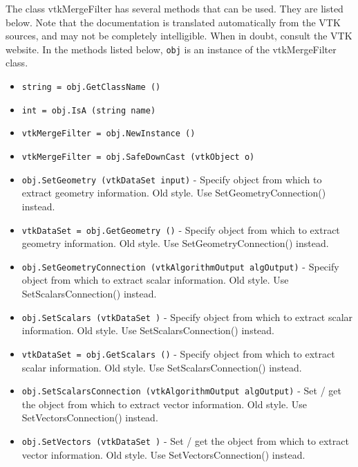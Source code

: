 The class vtkMergeFilter has several methods that can be used.
  They are listed below.
Note that the documentation is translated automatically from the VTK sources,
and may not be completely intelligible.  When in doubt, consult the VTK website.
In the methods listed below, \verb|obj| is an instance of the vtkMergeFilter class.
\begin{itemize}
\item  \verb|string = obj.GetClassName ()|

\item  \verb|int = obj.IsA (string name)|

\item  \verb|vtkMergeFilter = obj.NewInstance ()|

\item  \verb|vtkMergeFilter = obj.SafeDownCast (vtkObject o)|

\item  \verb|obj.SetGeometry (vtkDataSet input)| -  Specify object from which to extract geometry information.
 Old style. Use SetGeometryConnection() instead.

\item  \verb|vtkDataSet = obj.GetGeometry ()| -  Specify object from which to extract geometry information.
 Old style. Use SetGeometryConnection() instead.

\item  \verb|obj.SetGeometryConnection (vtkAlgorithmOutput algOutput)| -  Specify object from which to extract scalar information.
 Old style. Use SetScalarsConnection() instead.

\item  \verb|obj.SetScalars (vtkDataSet )| -  Specify object from which to extract scalar information.
 Old style. Use SetScalarsConnection() instead.

\item  \verb|vtkDataSet = obj.GetScalars ()| -  Specify object from which to extract scalar information.
 Old style. Use SetScalarsConnection() instead.

\item  \verb|obj.SetScalarsConnection (vtkAlgorithmOutput algOutput)| -  Set / get the object from which to extract vector information.
 Old style. Use SetVectorsConnection() instead.

\item  \verb|obj.SetVectors (vtkDataSet )| -  Set / get the object from which to extract vector information.
 Old style. Use SetVectorsConnection() instead.


\end{itemize}
